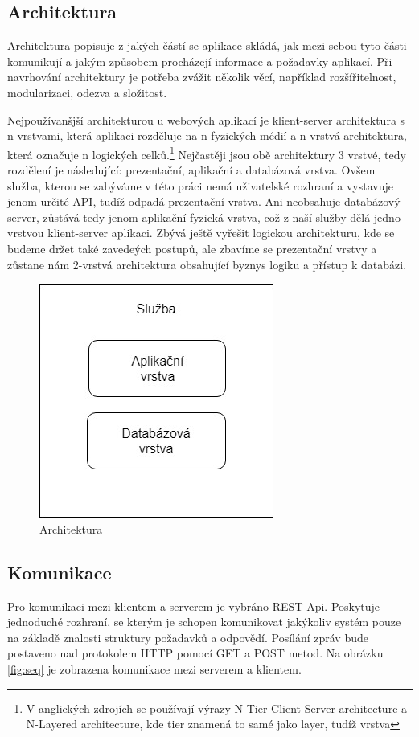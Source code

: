 \subsection{Architektura}
Architektura popisuje z jakých částí se aplikace skládá, jak mezi sebou tyto části komunikují a jakým způsobem procházejí informace a požadavky aplikací. Při navrhování architektury je potřeba zvážit několik věcí, například rozšířitelnost, modularizaci, odezva a složitost. 
\par
Nejpoužívanšjší architekturou u webových aplikací je klient-server architektura s n vrstvami, která aplikaci rozděluje na n fyzických médií a n vrstvá architektura, která označuje n logických celků.\footnote{V anglických zdrojích se používají výrazy N-Tier Client-Server architecture a N-Layered architecture, kde tier znamená to samé jako layer, tudíž vrstva} Nejčastěji jsou obě architektury 3 vrstvé, tedy rozdělení je následující: prezentační, aplikační a databázová vrstva. Ovšem služba, kterou se zabýváme v této práci nemá uživatelské rozhraní a vystavuje jenom určité API, tudíž odpadá prezentační vrstva. Ani neobsahuje databázový server, zůstává tedy jenom aplikační fyzická vrstva, což z naší služby dělá jedno-vrstvou klient-server aplikaci. Zbývá ještě vyřešit logickou architekturu, kde se budeme držet také zavedeých postupů, ale zbavíme se prezentační vrstvy a zůstane nám 2-vrstvá architektura obsahující byznys logiku a přístup k databázi.  

\begin{figure}[H]
	\includegraphics[scale=0.7]{architecture}
	\centering
	\caption{Architektura}
	\label{fig:arch}
\end{figure}

\subsection{Komunikace}
Pro komunikaci mezi klientem a serverem je vybráno REST Api. Poskytuje jednoduché rozhraní, se kterým je schopen komunikovat jakýkoliv systém pouze na základě znalosti struktury požadavků a odpovědí. Posílání zpráv bude postaveno nad protokolem HTTP pomocí GET a POST metod. Na obrázku \ref{fig:seq} je zobrazena komunikace mezi serverem a klientem. 

